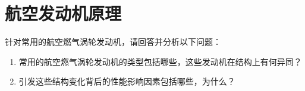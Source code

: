 
\part{航空发动机原理}

\begin{tcolorbox}
    针对常用的航空燃气涡轮发动机，请回答并分析以下问题：
    \begin{enumerate}
        \item 常用的航空燃气涡轮发动机的类型包括哪些，这些发动机在结构上有何异同？
        \item 引发这些结构变化背后的性能影响因素包括哪些，为什么？
    \end{enumerate}
\end{tcolorbox}
